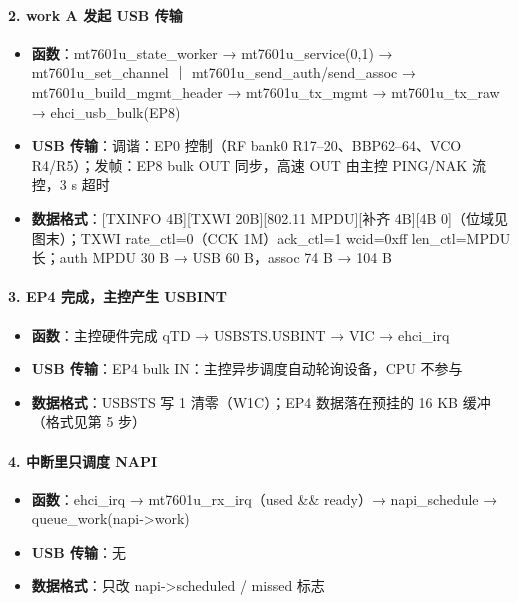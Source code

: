 \documentclass[UTF8,zihao=-4,fontset=none]{ctexart}
\begin{document}
\paragraph*{2. work A 发起 USB 传输}
\begin{itemize}[leftmargin=2em,itemsep=1pt]
\item \textbf{函数}：mt7601u\_state\_worker → mt7601u\_service(0,1) → mt7601u\_set\_channel ｜ mt7601u\_send\_auth/send\_assoc → mt7601u\_build\_mgmt\_header → mt7601u\_tx\_mgmt → mt7601u\_tx\_raw → ehci\_usb\_bulk(EP8)
\item \textbf{USB 传输}：调谐：EP0 控制（RF bank0 R17–20、BBP62–64、VCO R4/R5）；发帧：EP8 bulk OUT 同步，高速 OUT 由主控 PING/NAK 流控，3 s 超时
\item \textbf{数据格式}：[TXINFO 4B][TXWI 20B][802.11 MPDU][补齐 4B][4B 0]（位域见图末）；TXWI rate\_ctl=0（CCK 1M）ack\_ctl=1 wcid=0xff len\_ctl=MPDU 长；auth MPDU 30 B → USB 60 B，assoc 74 B → 104 B
\end{itemize}

\paragraph*{3. EP4 完成，主控产生 USBINT}
\begin{itemize}[leftmargin=2em,itemsep=1pt]
\item \textbf{函数}：主控硬件完成 qTD → USBSTS.USBINT → VIC → ehci\_irq
\item \textbf{USB 传输}：EP4 bulk IN：主控异步调度自动轮询设备，CPU 不参与
\item \textbf{数据格式}：USBSTS 写 1 清零（W1C）；EP4 数据落在预挂的 16 KB 缓冲（格式见第 5 步）
\end{itemize}

\paragraph*{4. 中断里只调度 NAPI}
\begin{itemize}[leftmargin=2em,itemsep=1pt]
\item \textbf{函数}：ehci\_irq → mt7601u\_rx\_irq（used \&\& ready）→ napi\_schedule → queue\_work(napi->work)
\item \textbf{USB 传输}：无
\item \textbf{数据格式}：只改 napi->scheduled / missed 标志
\end{itemize}
\end{document}

